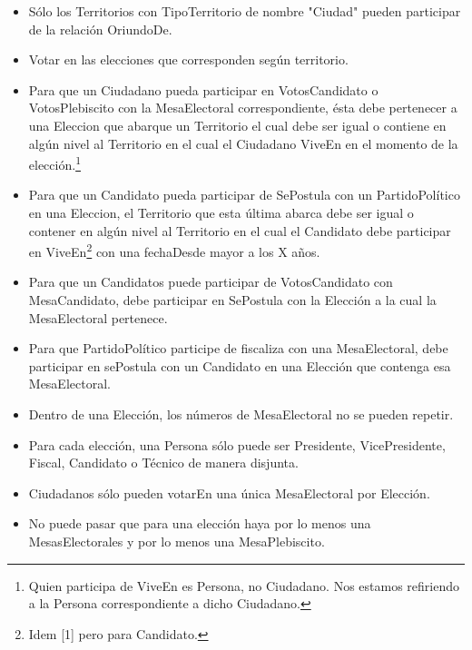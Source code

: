 \begin{itemize}
\item{Sólo los Territorios con TipoTerritorio de nombre "Ciudad" pueden participar de la relación OriundoDe.}
\item{Votar en las elecciones que corresponden según territorio.}

\item{Para que un Ciudadano pueda participar en VotosCandidato o VotosPlebiscito con la MesaElectoral correspondiente, ésta debe pertenecer a una Eleccion que abarque un Territorio el cual debe ser igual o contiene en algún nivel al Territorio en el cual el Ciudadano ViveEn en el momento de la elección.\footnote{Quien participa de ViveEn es Persona, no Ciudadano. Nos estamos refiriendo a la Persona correspondiente a dicho Ciudadano.}
}


\item{Para que un Candidato pueda participar de SePostula con un PartidoPolítico en una Eleccion, el Territorio que esta última abarca debe ser igual o contener en algún nivel al Territorio en el cual el Candidato debe participar en ViveEn\footnote{Idem [1] pero para Candidato.} con una fechaDesde mayor a los X años.
}


\item{Para que un Candidatos puede participar de VotosCandidato con MesaCandidato, debe participar en SePostula con la Elección a la cual la MesaElectoral pertenece.
}


\item{Para que PartidoPolítico participe de fiscaliza con una MesaElectoral, debe participar en sePostula con un Candidato en una Elección que contenga esa MesaElectoral.}

\item{Dentro de una Elección, los números de MesaElectoral no se pueden repetir.}

\item{Para cada elección, una Persona sólo puede ser Presidente, VicePresidente, Fiscal, Candidato o Técnico de manera disjunta.}


\item{Ciudadanos sólo pueden votarEn una única MesaElectoral por Elección.}

\item{No puede pasar que para una elección haya por lo menos una  MesasElectorales y por lo menos una MesaPlebiscito.}


\end{itemize}
